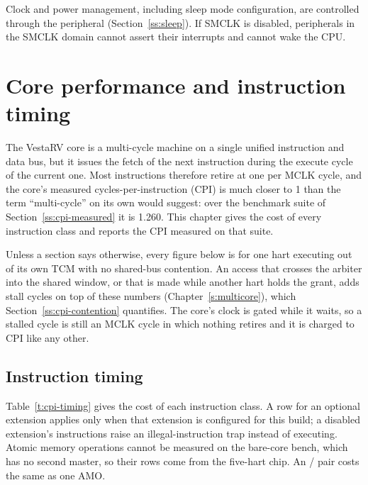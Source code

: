 \documentclass[11pt,pdftex,openany,letterpaper]{report}
\begin{document}
Clock and power management, including sleep mode configuration, are controlled through the  peripheral (Section~\ref{ss:sleep}). If SMCLK is disabled, peripherals in the SMCLK domain cannot assert their interrupts and cannot wake the CPU.

\clearpage



\chapter{Core performance and instruction timing} \label{s:cpi}

The VestaRV core is a multi-cycle machine on a single unified instruction and data bus, but it issues the fetch of the next instruction during the execute cycle of the current one. Most instructions therefore retire at one per MCLK cycle, and the core's measured cycles-per-instruction (CPI) is much closer to 1 than the term ``multi-cycle'' on its own would suggest: over the benchmark suite of Section~\ref{ss:cpi-measured} it is 1.260. This chapter gives the cost of every instruction class and reports the CPI measured on that suite.

Unless a section says otherwise, every figure below is for one hart executing out of its own TCM with no shared-bus contention. An access that crosses the arbiter into the shared window, or that is made while another hart holds the grant, adds stall cycles on top of these numbers (Chapter~\ref{s:multicore})\ifnum{}, which Section~\ref{ss:cpi-contention} quantifies\fi. The core's clock is gated while it waits, so a stalled cycle is still an MCLK cycle in which nothing retires and it is charged to CPI like any other.

\section{Instruction timing} \label{ss:cpi-timing}

Table~\ref{t:cpi-timing} gives the cost of each instruction class. A row for an optional extension applies only when that extension is configured for this build; a disabled extension's instructions raise an illegal-instruction trap instead of executing. Atomic memory operations cannot be measured on the bare-core bench, which has no second master, so their rows come from the five-hart chip. An / pair costs the same as one AMO.
\end{document}
